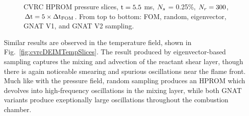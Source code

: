 \begin{figure}
\begin{minipage}{0.99\linewidth}
	\end{minipage}
	\caption{\label{fig:cvrcDEIMPressSlices}CVRC HPROM pressure slices, $\text{t} = 5.5$ ms, $N_s$ = 0.25\%, $N_r = 300$, $\Delta \text{t} = 5 \times \Delta \text{t}_{\text{FOM}}$. From top to bottom: FOM, random, eigenvector, GNAT V1, and GNAT V2 sampling.}
\end{figure}

Similar results are observed in the temperature field, shown in Fig.~\ref{fig:cvrcDEIMTempSlices}. The result produced by eigenvector-based sampling captures the mixing and advection of the reactant shear layer, though there is again noticeable smearing and spurious oscillations near the flame front. Much like with the pressure field, random sampling produces an HPROM which devolves into high-frequency oscillations in the mixing layer, while both GNAT variants produce exeptionally large oscillations throughout the combustion chamber. 

